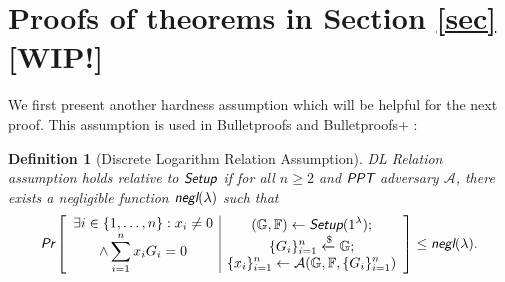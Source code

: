 \documentclass{article}
\theoremstyle{plain}
\newtheorem{definition}{Definition}[section]
\theoremstyle{remark}
\begin{document}



\appendix

\section{Proofs of theorems in Section \ref{sec} [WIP!]}\label{proofs}
We first present another hardness assumption which will be helpful for the next proof. This assumption is used in Bulletproofs \cite{bp} and Bulletproofs+ \cite{bp-plus}:

\begin{definition}[Discrete Logarithm Relation Assumption]\label{dl-rel}
DL Relation assumption holds relative to $\emph{\textsf{Setup}}$ if for all $n \ge 2$ and  $\emph{\textsf{PPT}}$ adversary $\mathcal{A}$, there exists a negligible function $\emph{\textsf{negl}}(\lambda)$ such that
\begin{align*}
\emph{\textsf{Pr}}\left[
\begin{array}{c|c}
	\begin{gathered}
		\exists i \in \{1, \ldots, n\}: x_i \ne 0 \\
		\wedge \sum_{i=1}^{n} x_i G_i = 0
	\end{gathered}
	&
	\begin{gathered}
		(\mathbb{G}, \mathbb{F})\leftarrow\emph{\textsf{Setup}}(1^{\lambda}); \\
		\{G_i\}_{i=1}^n \xleftarrow{\$}\mathbb{G}; \\
		\{x_i\}_{i=1}^n \leftarrow\mathcal{A}(\mathbb{G}, \mathbb{F}, \{G_i\}_{i=1}^n) \\
	\end{gathered}
\end{array}
\right]
\le \emph{\textsf{negl}}(\lambda).
\end{align*}
\end{definition}
\end{document}
